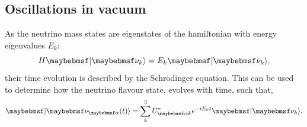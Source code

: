 \subsection{Oscillations in vacuum} %
\label{sec:theory_oscillations_vacuum} %

As the neutrino mass states are eigenstates of the hamiltonian with energy eigenvalues $E_{k}$:
\begin{equation} %
    H \ket{\nu_{k}} = E_{k} \ket{\nu_{k}},
    \label{eq:hamiltonian}
\end{equation}
their time evolution is described by the Schr$\mathrm{\ddot{o}}$dinger equation. This can be used
to determine how the neutrino flavour state, evolves with time, such that,
\begin{equation} %
    \ket{\nu_{\alpha}(t)}=\sum_{k}^{3}U_{\alpha k}^{*}e^{-iE_{k}t}\ket{\nu_{k}}.
    \label{eq:time_evolution_1}
\end{equation}

